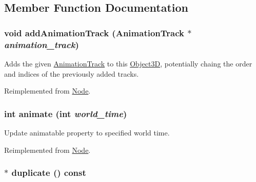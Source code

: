 \subsection{Member Function Documentation}
\hypertarget{classm3g_1_1Camera_415c0b110f95410ded9b85e5d99a496b}{
\subsubsection[{addAnimationTrack}]{\setlength{\rightskip}{0pt plus 5cm}void addAnimationTrack ({\bf AnimationTrack} $\ast$ {\em animation\_\-track})}}
\label{classm3g_1_1Camera_415c0b110f95410ded9b85e5d99a496b}


Adds the given \hyperlink{classm3g_1_1AnimationTrack}{AnimationTrack} to this \hyperlink{classm3g_1_1Object3D}{Object3D}, potentially chaing the order and indices of the previously added tracks. 

Reimplemented from \hyperlink{classm3g_1_1Node_415c0b110f95410ded9b85e5d99a496b}{Node}.\hypertarget{classm3g_1_1Camera_8aad1ceab4c2a03609c8a42324ce484d}{
\subsubsection[{animate}]{\setlength{\rightskip}{0pt plus 5cm}int animate (int {\em world\_\-time})}}
\label{classm3g_1_1Camera_8aad1ceab4c2a03609c8a42324ce484d}


Update animatable property to specified world time. 

Reimplemented from \hyperlink{classm3g_1_1Node_8aad1ceab4c2a03609c8a42324ce484d}{Node}.\hypertarget{classm3g_1_1Camera_6279f7f8ab52af683fadd193d7694f2d}{
\subsubsection[{duplicate}]{ $\ast$ duplicate () const}}
\label{classm3g_1_1Camera_6279f7f8ab52af683fadd193d7694f2d}


